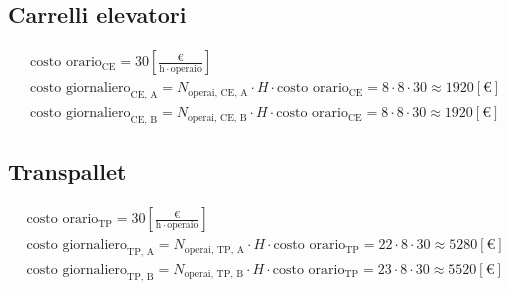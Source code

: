 \documentclass[a4paper,12pt]{article}
\begin{document}
\subsection{Carrelli elevatori}
\begin{align*}
  &\text{costo orario}_{\text{CE}} = 30 \left[\frac{\text{€}}{\mathrm{h} \cdot \text{operaio}}\right] \\
  &\text{costo giornaliero}_{\text{CE, A}} = N_{\text{operai, CE, A}} \cdot H \cdot \text{costo orario}_{\text{CE}} = 8 \cdot 8 \cdot 30 \approx 1920\left[\text{€}\right] \\
  &\text{costo giornaliero}_{\text{CE, B}} = N_{\text{operai, CE, B}} \cdot H \cdot \text{costo orario}_{\text{CE}} = 8 \cdot 8 \cdot 30 \approx 1920 \left[\text{€}\right]
\end{align*}
\subsection{Transpallet}
\begin{align*}
  &\text{costo orario}_{\text{TP}} = 30 \left[\frac{\text{€}}{\mathrm{h} \cdot \text{operaio}}\right] \\
  &\text{costo giornaliero}_{\text{TP, A}} = N_{\text{operai, TP, A}} \cdot H \cdot \text{costo orario}_{\text{TP}} = 22 \cdot 8 \cdot 30 \approx 5280 \left[\text{€}\right] \\
  &\text{costo giornaliero}_{\text{TP, B}} = N_{\text{operai, TP, B}} \cdot H \cdot \text{costo orario}_{\text{TP}} = 23 \cdot 8 \cdot 30 \approx 5520 \left[\text{€}\right]
\end{align*}
\end{document}
